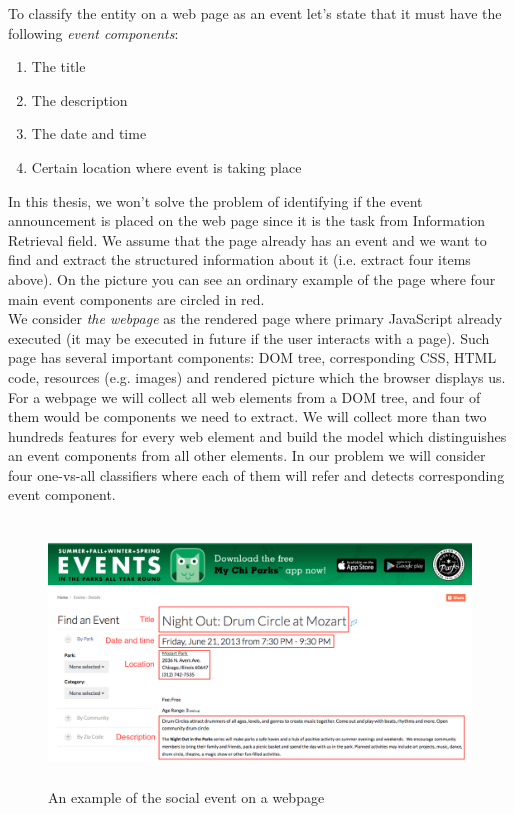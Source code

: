To classify the entity on a web page as an event let's state that it must have the following \textit{event components}:
\begin{enumerate}
    \item The title
    \item The description
    \item The date and time
    \item Certain location where event is taking place
\end{enumerate}

In this thesis, we won't solve the problem of identifying if the event announcement is placed on the web page since it is the task from Information Retrieval field. We assume that the page already has an event and we want to find and extract the structured information about it (i.e. extract four items above). On the picture  you can see an ordinary example of the page where four main event components are circled in red.\\

We consider \textit{the webpage} as the rendered page where primary JavaScript already executed (it may be executed in future if the user interacts with a page). Such page has several important components: DOM tree, corresponding CSS, HTML code, resources (e.g. images) and rendered picture which the browser displays us. \\

For a webpage we will collect all web elements from a DOM tree, and four of them would be components we need to extract. We will collect more than two hundreds features for every web element and build the model which distinguishes an event components from all other elements. In our problem we will consider four one-vs-all classifiers where each of them will refer and detects corresponding event component. 

\begin{figure}[h]
\begin{center}
\includegraphics[height=7cm]{figures01/event_example}
\caption{An example of the social event on a webpage}
\label{fig:webevent}
\end{center}
\end{figure}


